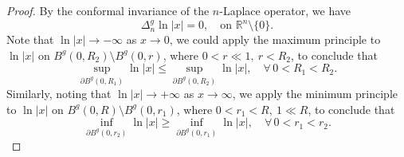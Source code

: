 \documentclass[10pt,a4paper]{amsart}
\numberwithin{equation}{section}
\begin{document}
\begin{proof}
    By the conformal invariance of the $n$-Laplace operator, we have
    \[
        \Delta_n^g\ln |x|=0,\quad \text{on } \mathbb{R}^n\setminus\{0\}.
    \]
    Note that $\ln |x|\to-\infty$ as $x\to 0$, we could apply the maximum principle to $\ln |x|$ on $B^g(0,R_2)\setminus B^g(0,r)$, where $0<r\ll1,\ r<R_2$, to conclude that
    \[
        \sup_{\partial B^g(0,R_1)}\ln |x|
        \leq  \sup_{\partial B^g(0,R_2)}\ln |x|,\quad \forall \,0<R_1<R_2.
    \]
 Similarly, noting that $\ln |x|\to +\infty$ as $x\to \infty$, we apply the minimum principle to $\ln |x|$ on $B^g(0,R)\setminus B^g(0,r_1)$, where $0<r_1<R,\ 1\ll R$, to conclude that
    \[
        \inf_{\partial B^g(0,r_2)}\ln |x|
        \geq  \inf_{\partial B^g(0,r_1)}\ln |x|,\quad \forall \,0<r_1<r_2.
    \]
\end{proof}
\end{document}
